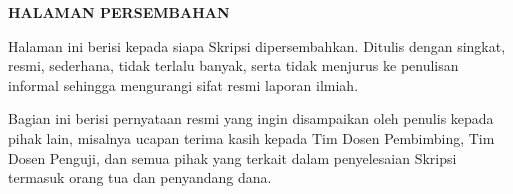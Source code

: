 \begin{center}
  {\bfseries HALAMAN PERSEMBAHAN\par}
\end{center}

\noindent
Halaman ini berisi kepada siapa Skripsi dipersembahkan. Ditulis
dengan singkat, resmi, sederhana, tidak terlalu banyak, serta
tidak menjurus ke penulisan informal sehingga mengurangi sifat
resmi laporan ilmiah.

\noindent
Bagian ini berisi pernyataan resmi yang ingin disampaikan oleh
penulis kepada pihak lain, misalnya ucapan terima kasih kepada
Tim Dosen Pembimbing, Tim Dosen Penguji, dan semua pihak yang
terkait dalam penyelesaian Skripsi termasuk orang tua dan
penyandang dana.

\clearpage
